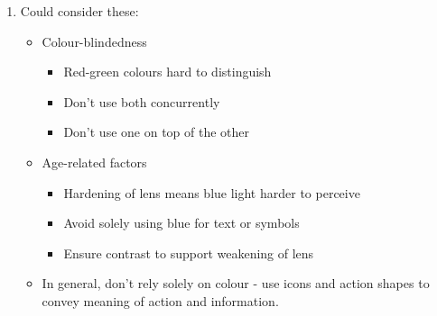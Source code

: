\documentclass[11pt,a4paper]{report}
\begin{document}
\begin{enumerate}
    \item Could consider these:
        \begin{itemize}
            \item Colour-blindedness
                \begin{itemize}
                    \item Red-green colours hard to distinguish
                    \item Don't use both concurrently
                    \item Don't use one on top of the other
                \end{itemize}
            \item Age-related factors
                \begin{itemize}
                    \item Hardening of lens means blue light harder to perceive
                    \item Avoid solely using blue for text or symbols
                    \item Ensure contrast to support weakening of lens
                \end{itemize}
            \item In general, don't rely solely on colour - use icons and action shapes to convey meaning of action and information.
        \end{itemize}

\end{enumerate}
\end{document}

